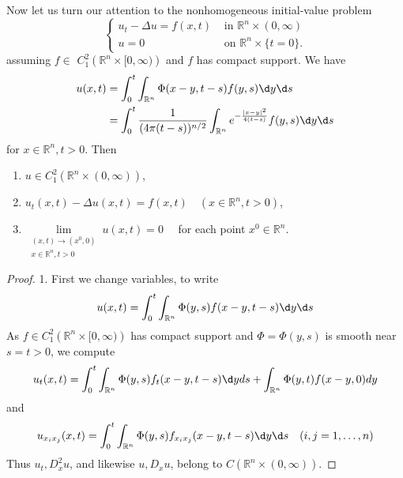 \begin{theorem}
    Now let us turn our attention to the nonhomogeneous initial-value problem
    \begin{equation*}
        \left\{
        \begin{aligned}
            u_t-\Delta u=f(x,t) & \text { in } \mathbb{R}^n \times(0, \infty) \\
            u=0                 & \text { on } \mathbb{R}^n \times\{t=0\} .
        \end{aligned}\right.
    \end{equation*}
    assuming $f \in$ $C_1^2\left(\mathbb{R}^n \times[0, \infty)\right)$ and $f$ has compact support.
    We have
    \begin{equation*}
        \begin{aligned}
            u(x, t) & =\int_0^t \int_{\mathbb{R}^n} \Phi(x-y, t-s) f(y, s) \d y \d s                                             \\
                    & =\int_0^t \frac{1}{(4 \pi(t-s))^{n / 2}} \int_{\mathbb{R}^n} e^{-\frac{|x-y|^2}{4(t-s)}} f(y, s) \d y \d s
        \end{aligned}
    \end{equation*}
    for $x \in \mathbb{R}^n, t>0$. Then
    \begin{enumerate}
        \item
              $u \in C_1^2\left(\mathbb{R}^n \times(0, \infty)\right)$,

        \item  $u_t(x, t)-\Delta u(x, t)=f(x, t) \quad\left(x \in \mathbb{R}^n, t>0\right)$,

        \item  $\lim\limits_{\substack{(x, t) \rightarrow\left(x^0, 0\right) \\ x \in \mathbb{R}^n, t>0}} u(x, t)=0 \quad$ for each point $x^0 \in \mathbb{R}^n$.
    \end{enumerate}
    \begin{proof}
        1. First we change variables, to write
        \begin{equation*}
            u(x, t)=\int_0^t \int_{\mathbb{R}^n} \Phi(y, s) f(x-y, t-s) \d y \d s
        \end{equation*}
        As $f \in C_1^2\left(\mathbb{R}^n \times[0, \infty)\right)$ has compact support and $\Phi=\Phi(y, s)$ is smooth near $s=t>0$, we compute
        \begin{equation*}
            u_t(x, t)=  \int_0^t \int_{\mathbb{R}^n} \Phi(y, s) f_t(x-y, t-s)\d yds
            +\int_{\mathbb{R}^n} \Phi(y, t) f(x-y, 0) d y
        \end{equation*}
        and
        \begin{equation*}
            u_{x_i x_j}(x, t)=\int_0^t \int_{\mathbb{R}^n} \Phi(y, s) f_{x_i x_j}(x-y, t-s) \d y \d s \quad(i, j=1, \ldots, n)
        \end{equation*}
        Thus $u_t, D_x^2 u$, and likewise $u, D_x u$, belong to $C\left(\mathbb{R}^n \times(0, \infty)\right)$.


\end{proof}
\end{theorem}
